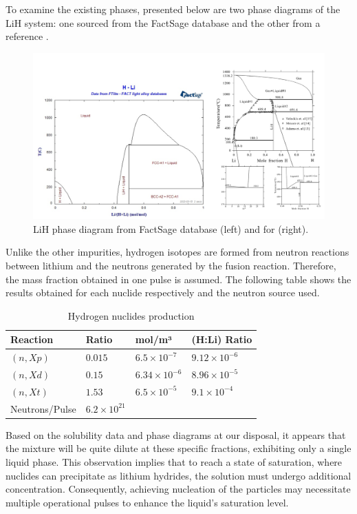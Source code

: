 To examine the existing phases, presented below are two phase diagrams of the LiH system: one sourced from the FactSage database \cite{Bale2016} and the other from a reference \cite{Wang2012}.
\begin{figure}[H]
    \centering
    \includegraphics[width=0.9\linewidth]{lih_diagram.png}
    \caption{LiH phase diagram from FactSage database (left) and for \cite{Wang2012} (right).}
    \label{fig:lih_diagram}
\end{figure}

Unlike the other impurities, hydrogen isotopes are formed from neutron reactions between lithium and the neutrons generated by the fusion reaction. 
Therefore, the mass fraction obtained in one pulse is assumed. The following table shows the results obtained for each nuclide respectively and the neutron source used.

\begin{table}[h]
	\centering
	\begin{tabular}{|l|l|l|l|}
	\hline
	\textbf{Reaction} & \textbf{Ratio} & \textbf{mol/m³} & \textbf{(H:Li) Ratio} \\ \hline
	$(n,Xp)$ & $0.015$ & $6.5 \times 10^{-7}$ & $9.12 \times 10^{-6}$ \\ \hline
	$(n,Xd)$ & $0.15$ & $6.34 \times 10^{-6}$ & $8.96 \times 10^{-5}$ \\ \hline
	$(n,Xt)$ & $1.53$ & $6.5 \times 10^{-5}$ & $9.1 \times 10^{-4}$ \\ \hline
	Neutrons/Pulse & $6.2 \times 10^{21}$ &  & \\ \cline{1-2}
	\end{tabular}
	\caption{Hydrogen nuclides production}
	\label{tab:h_production}
\end{table}

Based on the solubility data and phase diagrams at our disposal, it appears that the mixture will 
be quite dilute at these specific fractions, exhibiting only a single liquid phase. This observation 
implies that to reach a state of saturation, where nuclides can precipitate as lithium hydrides, the 
solution must undergo additional concentration. Consequently, achieving nucleation of the particles 
may necessitate multiple operational pulses to enhance the liquid's saturation level.


